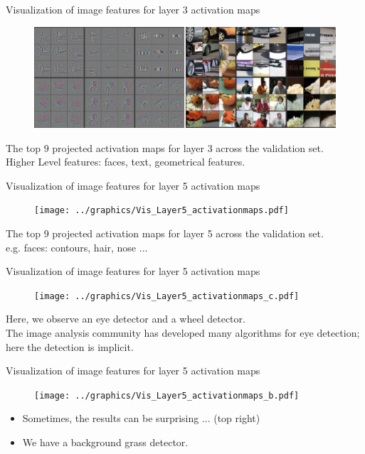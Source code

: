 \documentclass[xcolor=pdftex,dvipsnames,table]{beamer}
\begin{document}
\begin{frame}{Visualization of image features for layer 3 activation maps}
\begin{figure}[htb]
  \centering
  \includegraphics[width=\textwidth]{../graphics/Vis_Layer3_activationmaps.png}
\end{figure}
The top 9 projected activation maps for layer 3 across the validation set. \\
Higher Level features: faces, text, geometrical features.
\end{frame}

\begin{frame}{Visualization of image features for layer 5 activation maps}
\begin{figure}[htb]
  \centering
  \texttt{[image: ../graphics/Vis\_Layer5\_activationmaps.pdf]}
\end{figure}
The top 9 projected activation maps for layer 5 across the validation set. \\
e.g. faces: contours, hair, nose ... 
\end{frame}

\begin{frame}{Visualization of image features for layer 5 activation maps}
\begin{figure}[htb]
  \centering
  \texttt{[image: ../graphics/Vis\_Layer5\_activationmaps\_c.pdf]}
\end{figure}
Here, we observe an eye detector and a wheel detector. \\
The image analysis community has developed many algorithms for eye detection; here the detection is implicit.
\end{frame}

\begin{frame}{Visualization of image features for layer 5 activation maps}
\begin{figure}[htb]
  \centering
  \texttt{[image: ../graphics/Vis\_Layer5\_activationmaps\_b.pdf]}
\end{figure}
\begin{itemize}
\item <1-> Sometimes, the results can be surprising ... (top right)
\item <2-> We have a background grass detector. 
\end{itemize}
\end{frame}
\end{document}
